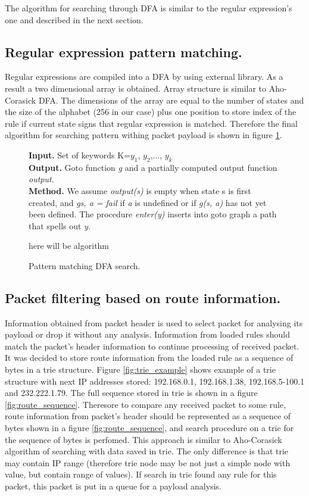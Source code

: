 \documentclass[thesis=M,english]{FITthesis}[2011/07/15]
\begin{document}
The algorithm for searching through DFA is similar to the regular expression's one and described in the next section.

\subsection*{Regular expression pattern matching.}
Regular expressions are compiled into a DFA by using external library. As a result a two dimensional array is obtained. Array structure is similar to Aho-Corasick DFA. The dimensions of the array are equal to the number of states and the size of the alphabet (256 in our case) plus one position to store index of the rule if current state signs that regular expression is matched. Therefore the final algorithm for searching pattern withing packet payload is shown in figure \ref{fig:dfa_search}.

\begin{figure}[h]
\textbf{Input.} Set of keywords K={$y_1$, $y_2$,..., $y_k$} \\
\textbf{Output.} Goto function \emph{g} and a partially computed output function \emph{output}.\\
\textbf{Method.} We assume \emph{output(s)} is empty when state s is first created, and \emph{g{s, a} = fail} if \emph{a} is undefined or if \emph{g(s, a)} has not yet been defined. The procedure \emph{enter(y)} inserts into goto graph a path that spells out \emph{y}.
\begin{algorithmic}
\PRINT here will be algorithm
\end{algorithmic}
\caption{Pattern matching DFA search.}
\label{fig:dfa_search}
\end{figure}

\subsection*{Packet filtering based on route information.}
Information obtained from packet header is used to select packet for analysing its payload or drop it without any analysis. Information from loaded rules should match the packet's header information to continue processing of received packet. It was decided to store route information from the loaded rule as a sequence of bytes in a trie structure. Figure \ref{fig:trie_example} shows example of a trie structure with next IP addresses stored: 192.168.0.1, 192.168.1.38, 192.168.5-100.1 and 232.222.1.79. The full sequence stored in trie is shown in a figure \ref{fig:route_sequence}. Theresore to compare any received packet to some rule, route information from packet's header should be represented as a sequence of bytes shown in a figure \ref{fig:route_sequence}, and search procedure on a trie for the sequence of bytes is perfomed. This approach is similar to Aho-Corasick algorithm of searching with data saved in trie. The only difference is that trie may contain IP range (therefore trie node may be not just a simple node with value, but contain range of values). If search in trie found any rule for this packet, this packet is put in a queue for a payload analysis. 
\end{document}
